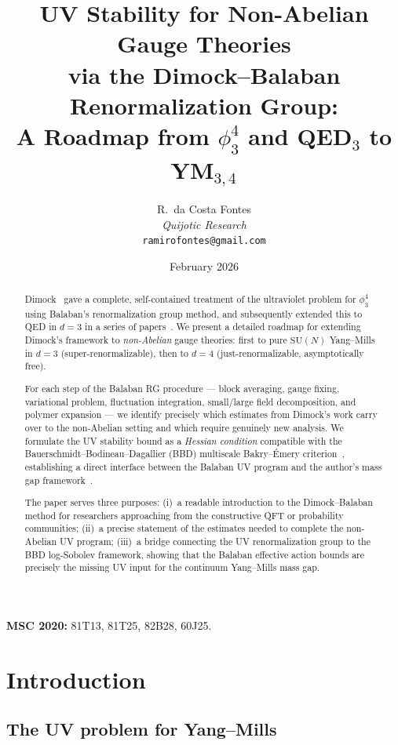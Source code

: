 \documentclass[11pt,a4paper]{article}
\title{UV Stability for Non-Abelian Gauge Theories\\
  via the Dimock--Balaban Renormalization Group:\\
  A Roadmap from $\phi^4_3$ and QED$_3$ to YM$_{3,4}$}
\author{R.\ da Costa Fontes\\ \textit{Quijotic Research}\\
\texttt{ramirofontes@gmail.com}}
\date{February 2026}
\theoremstyle{plain}
\theoremstyle{definition}
\theoremstyle{remark}
\newcommand{\SU}{\mathrm{SU}}
\begin{document}
\maketitle

\begin{abstract}
Dimock~\cite{Dimock13a,Dimock13b,Dimock14} gave a complete,
self-contained treatment of the ultraviolet problem for
$\phi^4_3$ using Balaban's renormalization group method,
and subsequently extended this to QED in $d=3$
in a series of papers~\cite{Dimock02,Dimock04,Dimock15a,Dimock15b,Dimock18,Dimock22}.
We present a detailed roadmap for extending Dimock's
framework to \emph{non-Abelian} gauge theories:
first to pure $\SU(N)$ Yang--Mills in $d=3$
(super-renormalizable), then to $d=4$ (just-renormalizable,
asymptotically free).

For each step of the Balaban RG procedure ---
block averaging, gauge fixing, variational problem,
fluctuation integration, small/large field decomposition,
and polymer expansion --- we identify precisely which
estimates from Dimock's work carry over to the
non-Abelian setting and which require genuinely new analysis.
We formulate the UV stability bound
as a \emph{Hessian condition} compatible with the
Bauerschmidt--Bodineau--Dagallier (BBD) multiscale
Bakry--\'Emery criterion~\cite{BBD24}, establishing
a direct interface between the Balaban UV program
and the author's mass gap framework~\cite{FontesBBD}.

The paper serves three purposes: (i)~a readable introduction
to the Dimock--Balaban method for researchers approaching
from the constructive QFT or probability communities;
(ii)~a precise statement of the estimates needed to
complete the non-Abelian UV program;
(iii)~a bridge connecting the UV renormalization group
to the BBD log-Sobolev framework, showing that the
Balaban effective action bounds are precisely the
missing UV input for the continuum Yang--Mills mass gap.
\end{abstract}

\noindent\textbf{MSC 2020:} 81T13, 81T25, 82B28, 60J25.

\section{Introduction}\label{sec:intro}

\subsection{The UV problem for Yang--Mills}
\end{document}
